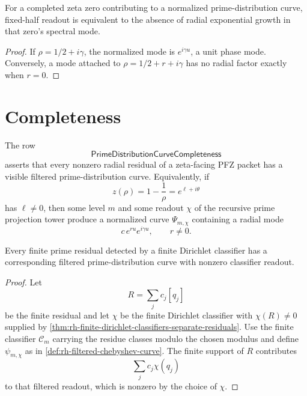 \begin{corollary}
\label{cor:rh-fixed-half-readout-unit-mode-readout}
For a completed zeta zero contributing to a normalized
prime-distribution curve, fixed-half readout is equivalent to the
absence of radial exponential growth in that zero's spectral mode.
\end{corollary}

\begin{proof}
If $\rho=1/2+i\gamma$, the normalized mode is $e^{i\gamma u}$, a unit
phase mode.  Conversely, a mode attached to $\rho=1/2+r+i\gamma$ has no
radial factor exactly when $r=0$.
\end{proof}

\section{Completeness}
\label{sec:rh-prime-distribution-completeness}

\begin{definition}[PrimeDistributionCurveCompleteness]
\label{def:rh-prime-distribution-curve-completeness}
The row
$$
\mathsf{PrimeDistributionCurveCompleteness}
$$
asserts that every nonzero radial residual of a zeta-facing PFZ packet
has a visible filtered prime-distribution curve.  Equivalently, if
$$
z(\rho)=1-\frac1\rho=e^{\ell+i\theta}
$$
has $\ell\ne0$, then some level $m$ and some readout $\chi$ of the
recursive prime projection tower produce a normalized curve
$\Psi_{m,\chi}$ containing a radial mode
$$
c\,e^{ru}e^{i\gamma u},
\qquad
r\ne0.
$$
\end{definition}

\begin{theorem}
\label{thm:rh-finite-residual-detection-supplies-filtered-curve}
Every finite prime residual detected by a finite Dirichlet classifier
has a corresponding filtered prime-distribution curve with nonzero
classifier readout.
\end{theorem}

\begin{proof}
Let
$$
R=\sum_j c_j[q_j]
$$
be the finite residual and let $\chi$ be the finite Dirichlet classifier
with $\chi(R)\ne0$ supplied by
\autoref{thm:rh-finite-dirichlet-classifiers-separate-residuals}.  Use
the finite classifier $\mathcal C_m$ carrying the residue classes modulo
the chosen modulus and define $\psi_{m,\chi}$ as in
\autoref{def:rh-filtered-chebyshev-curve}.  The finite support of $R$
contributes
$$
\sum_j c_j\chi(q_j)
$$
to that filtered readout, which is nonzero by the choice of $\chi$.
\end{proof}


